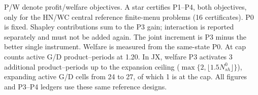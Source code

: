 \begin{table}[htbp]
\begin{minipage}{.95\textwidth}
\begin{tabular*}{\linewidth}{@{\extracolsep{\fill}}llrrrrrr@{}}
\bottomrule\end{tabular*}\par\medskip
\par\noindent\fontsize{8}{9.5}\selectfont P/W denote profit/welfare objectives. A star certifies P1--P4, both objectives, only for the HN/WC central reference finite-menu problems (16 certificates). P0 is fixed. Shapley contributions sum to the P3 gain; interaction is reported separately and must not be added again. The joint increment is P3 minus the better single instrument. Welfare is measured from the same-state P0. At cap counts active G/D product--periods at 1.20. In JX, welfare P3 activates 3 additional product--periods up to the expansion ceiling ($\max\{2, \lfloor 1.5 N^0_{sh} \rfloor\}$), expanding active G/D cells from 24 to 27, of which 1 is at the cap. All figures and P3--P4 ledgers use these same reference designs.
\end{minipage}\end{table}
